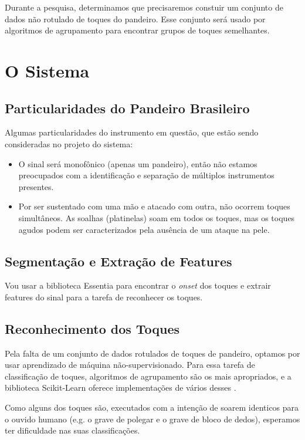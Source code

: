 \documentclass[
  dissertacao,
  brazil
]{ThesisPUC}
\begin{document}
Durante a pesquisa, determinamos que precisaremos constuir um conjunto de dados não rotulado de toques do pandeiro. Esse conjunto será usado por algoritmos de agrupamento para encontrar grupos de toques semelhantes.

\section{O Sistema}
\subsection{Particularidades do Pandeiro Brasileiro}
Algumas particularidades do instrumento em questão, que estão sendo consideradas no projeto do sistema: 
\begin{itemize}
    \item O sinal será monofônico (apenas um pandeiro), então não estamos preocupados com a identificação e separação de múltiplos instrumentos presentes.
    \item Por ser sustentado com uma mão e atacado com outra, não ocorrem toques simultâneos. As soalhas (platinelas) soam em todos os toques, mas os toques agudos podem ser caracterizados pela ausência de um ataque na pele.
\end{itemize}

\subsection{Segmentação e Extração de Features }
Vou usar a biblioteca Essentia para encontrar o \emph{onset} dos toques e extrair features do sinal para a tarefa de reconhecer os toques.

\subsection{Reconhecimento dos Toques}
Pela falta de um conjunto de dados rotulados de toques de pandeiro, optamos por usar aprendizado de máquina não-supervisionado. Para essa tarefa de classificação de toques, algoritmos de agrupamento são os mais apropriados, e a biblioteca Scikit-Learn oferece implementações de vários desses \cite{scikit2019Clustering}.

Como alguns dos toques são, executados com a intenção de soarem identicos para o ouvido humano (e.g. o grave de polegar e o grave de bloco de dedos), esperamos ter dificuldade nas suas classificações.
\end{document}
